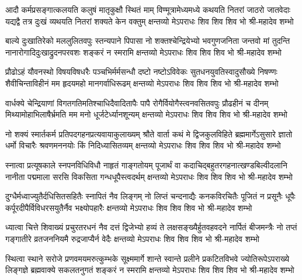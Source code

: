 \setlength{\shlokaspaceskip}{10pt}
\fourlineindentedshloka
{आदौ कर्मप्रसङ्गात्कलयति कलुषं मातृकुक्षौ स्थितं माम्}
{विण्मूत्रामेध्यमध्ये कथयति नितरां जाठरो जातवेदाः}
{यद्यद्वै तत्र दुःखं व्यथयति नितरां शक्यते केन वक्तुम्}
{क्षन्तव्यो मेऽपराधः शिव शिव शिव भो श्री-महादेव शम्भो} %

\fourlineindentedshloka
{बाल्ये दुःखातिरेको मललुलितवपुः स्तन्यपाने पिपासा}
{नो शक्तश्चेन्द्रियेभ्यो भवगुणजनिता जन्तवो मां तुदन्ति}
{नानारोगादिदुःखाद्रुदनपरवशः शङ्करं न स्मरामि}
{क्षन्तव्यो मेऽपराधः शिव शिव शिव भो श्री-महादेव शम्भो} %

\fourlineindentedshloka
{प्रौढोऽहं यौवनस्थो विषयविषधरैः पञ्चभिर्मर्मसन्धौ}
{दष्टो नष्टोऽविवेकः सुतधनयुवतिस्वादुसौख्ये निषण्णः}
{शैवीचिन्ताविहीनं मम हृदयमहो मानगर्वाधिरूढम्}
{क्षन्तव्यो मेऽपराधः शिव शिव शिव भो श्री-महादेव शम्भो} %

\fourlineindentedshloka
{वार्धक्ये चेन्द्रियाणां विगतगतिमतिश्चाधिदैवादितापैः}
{पापै रोगैर्वियोगैस्त्वनवसितवपुः प्रौढहीनं च दीनम्}
{मिथ्यामोहाभिलाषैर्भ्रमति मम मनो धूर्जटेर्ध्यानशून्यम्}
{क्षन्तव्यो मेऽपराधः शिव शिव शिव भो श्री-महादेव शम्भो} %

\fourlineindentedshloka
{नो शक्यं स्मार्तकर्म प्रतिपदगहनप्रत्यवायाकुलाख्यम्}
{श्रौते वार्ता कथं मे द्विजकुलविहिते ब्रह्ममार्गेऽसुसारे}
{ज्ञातो धर्मो विचारैः श्रवणमननयोः किं निदिध्यासितव्यम्}
{क्षन्तव्यो मेऽपराधः शिव शिव शिव भो श्री-महादेव शम्भो} %

\fourlineindentedshloka
{स्नात्वा प्रत्यूषकाले स्नपनविधिविधौ नाहृतं गाङ्गतोयम्}
{पूजार्थं वा कदाचिद्बहुतरगहनात्खण्डबिल्वीदलानि}
{नानीता पद्ममाला सरसि विकसिता गन्धधूपैस्त्वदर्थम्}
{क्षन्तव्यो मेऽपराधः शिव शिव शिव भो श्री-महादेव शम्भो} %

\fourlineindentedshloka
{दुग्धैर्मध्वाज्युतैर्दधिसितसहितैः स्नापितं नैव लिङ्गम्}
{नो लिप्तं चन्दनाद्यैः कनकविरचितैः पूजितं न प्रसूनैः}
{धूपैः कर्पूरदीपैर्विविधरसयुतैर्नैव भक्ष्योपहारैः}
{क्षन्तव्यो मेऽपराधः शिव शिव शिव भो श्री-महादेव शम्भो} %

\fourlineindentedshloka
{ध्यात्वा चित्ते शिवाख्यं प्रचुरतरधनं नैव दत्तं द्विजेभ्यो}
{हव्यं ते लक्षसङ्ख्यैर्हुतवहवदने नार्पितं बीजमन्त्रैः}
{नो तप्तं गङ्गातीरे व्रतजननियमै रुद्रजाप्यैर्न वेदैः}
{क्षन्तव्यो मेऽपराधः शिव शिव शिव भो श्री-महादेव शम्भो} %

\fourlineindentedshloka
{स्थित्वा स्थाने सरोजे प्रणवमयमरुत्कुम्भके सूक्ष्ममार्गे}
{शान्ते स्वान्ते प्रलीने प्रकटितविभवे ज्योतिरूपेऽपराख्ये}
{लिङ्गज्ञे ब्रह्मवाक्ये सकलतनुगतं शङ्करं न स्मरामि}
{क्षन्तव्यो मेऽपराधः शिव शिव शिव भो श्री-महादेव शम्भो} %


